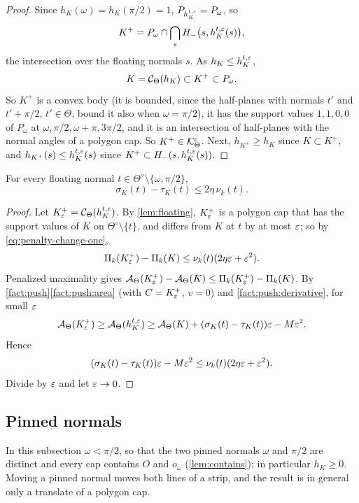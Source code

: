 \begin{proof}
Since $h_K(\omega)=h_K(\pi/2)=1$, $P_{h^{t,\varepsilon}_K}=P_\omega$, so
\[
  K^+=P_\omega\cap\bigcap_sH_-\bigl(s,h^{t,\varepsilon}_K(s)\bigr),
\]
the intersection over the floating normals $s$. As $h_K\le h^{t,\varepsilon}_K$,
\[
  K=\mathcal{C}_\Theta(h_K)\subset K^+\subset P_\omega.
\]
So $K^+$ is a convex body (it is bounded, since the half-planes with normals
$t'$ and $t'+\pi/2$, $t'\in\Theta$, bound it also when $\omega=\pi/2$), it has
the support values $1,1,0,0$ of $P_\omega$ at $\omega,\pi/2,\omega+\pi,3\pi/2$,
and it is an intersection of half-planes with the normal angles of a polygon
cap. So $K^+\in\mathcal{K}^{\mathrm{c}}_\Theta$. Next, $h_{K^+}\ge h_K$ since $K\subset K^+$, and
$h_{K^+}(s)\le h_K^{t,\varepsilon}(s)$ since $K^+\subset H_-(s,h^{t,\varepsilon}_K(s))$.
\end{proof}

\begin{proposition}\label{prop:floating}
For every floating normal $t\in\Theta^\diamond\setminus\{\omega,\pi/2\}$,
\[
  \sigma_K(t)-\tau_K(t)\le2\eta\,\nu_k(t).
\]
\end{proposition}

\begin{proof}
Let $K^+_\varepsilon=\mathcal{C}_\Theta(h^{t,\varepsilon}_K)$. By \cref{lem:floating}, $K^+_\varepsilon$ is a
polygon cap that has the support values of $K$ on
$\Theta^\diamond\setminus\{t\}$, and differs from $K$ at $t$ by at most $\varepsilon$;
so by \eqref{eq:penalty-change-one},
\[
  \Pi_k(K^+_\varepsilon)-\Pi_k(K)\le\nu_k(t)(2\eta\varepsilon+\varepsilon^2).
\]
Penalized maximality gives
$\mathcal{A}_\Theta(K^+_\varepsilon)-\mathcal{A}_\Theta(K)\le\Pi_k(K^+_\varepsilon)-\Pi_k(K)$. By
\cref{fact:push}\ref{fact:push:area} (with $C=K^+_\varepsilon$, $v=0$) and
\ref{fact:push:derivative}, for small $\varepsilon$
\[
  \mathcal{A}_\Theta(K^+_\varepsilon)\ge\mathcal{A}_\Theta(h_K^{t,\varepsilon})\ge\mathcal{A}_\Theta(K)+(\sigma_K(t)
    -\tau_K(t))\varepsilon-M\varepsilon^2 .
\]
Hence
\[
  (\sigma_K(t)-\tau_K(t))\varepsilon-M\varepsilon^2\le\nu_k(t)(2\eta\varepsilon+\varepsilon^2).
\]
Divide by $\varepsilon$ and let $\varepsilon\to0$.
\end{proof}

\subsection{Pinned normals}

In this subsection $\omega<\pi/2$, so that the two pinned normals $\omega$ and
$\pi/2$ are distinct and every cap contains $O$ and $o_\omega$
(\cref{lem:contains}); in particular $h_K\ge0$. Moving a pinned normal moves
both lines of a strip, and the result is in general only a translate of a
polygon cap.

